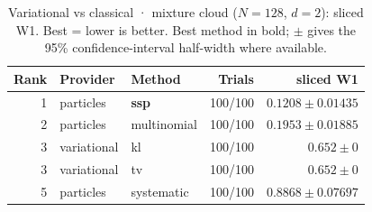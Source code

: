 \begin{table}[!htbp]
\centering
\small
\caption{Variational vs classical · mixture cloud ($N=128$, $d=2$): sliced W1. Best = lower is better. Best method in bold; $\pm$ gives the 95\% confidence-interval half-width where available.}
\label{tab:variational-vs-classical-mixture-cloud-sliced-w1}
\begin{tabular}{rllrr}
\toprule
Rank & Provider & Method & Trials & sliced W1 \\
\midrule
1 & particles & \textbf{ssp} & 100/100 & $\mathbf{0.1208 \pm 0.01435}$ \\
2 & particles & multinomial & 100/100 & $0.1953 \pm 0.01885$ \\
3 & variational & kl & 100/100 & $0.652 \pm 0$ \\
3 & variational & tv & 100/100 & $0.652 \pm 0$ \\
5 & particles & systematic & 100/100 & $0.8868 \pm 0.07697$ \\
\bottomrule
\end{tabular}
\end{table}
